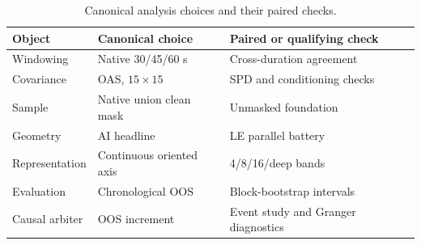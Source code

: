 
\begin{table}[!htbp]
\centering
\caption{Canonical analysis choices and their paired checks.}
\label{tab:app_canonical}
\small
\begin{tabular}{lll}
\toprule
Object & Canonical choice & Paired or qualifying check\\
\midrule
Windowing & Native 30/45/60 s & Cross-duration agreement\\
Covariance & OAS, $15\times15$ & SPD and conditioning checks\\
Sample & Native union clean mask & Unmasked foundation\\
Geometry & AI headline & LE parallel battery\\
Representation & Continuous oriented axis & 4/8/16/deep bands\\
Evaluation & Chronological OOS & Block-bootstrap intervals\\
Causal arbiter & OOS increment & Event study and Granger diagnostics\\
\bottomrule
\end{tabular}
\end{table}
